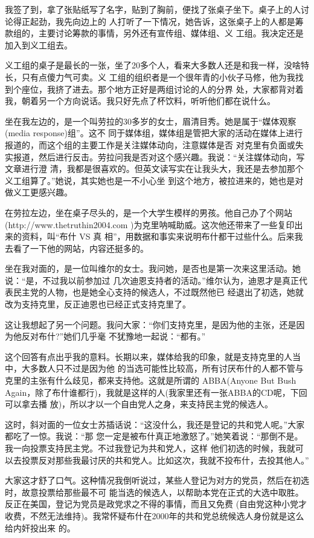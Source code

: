 ﻿\documentclass[11pt]{article}
\begin{document}
我签了到，拿了张贴纸写了名字，贴到了胸前，便找了张桌子坐下。桌子上的人讨论得正起劲，我先向边上的
人打听了一下情况，她告诉，这张桌子上的人都是筹款组的，主要讨论筹款的事情，另外还有宣传组、媒体组、义
工组。我决定还是加入到义工组去。

义工组的桌子是最长的一张，坐了20多个人，看来大多数人还是和我一样，没啥特长，只有点傻力气可卖。义
工组的组织者是一个很年青的小伙子马修，他为我找到个座位，我挤了进去。那个地方正好是两组讨论的人的分界
处，大家都背对着我，朝着另一个方向说话。我只好先点了杯饮料，听听他们都在说什么。

坐在我左边的，是一个叫劳拉的30多岁的女士，眉清目秀。她是属于``媒体观察(media response)组''。这不
同于媒体组，媒体组是管把大家的活动在媒体上进行报道的，而这个组的主要工作是关注媒体动向，注意媒体是否
对克里有负面或失实报道，然后进行反击。劳拉问我是否对这个感兴趣。我说：``关注媒体动向，写文章进行澄
清，我都是很喜欢的。但英文读写实在让我头大，我还是去参加那个义工组算了。''她说，其实她也是一不小心坐
到这个地方，被拉进来的，她也是对做义工更感兴趣。

在劳拉左边，坐在桌子尽头的，是一个大学生模样的男孩。他自己办了个网站
(http://www.thetruthin2004.com )为克里呐喊助威。这次他还带来了一些复印出来的资料，叫``布什 VS 真
相''，用数据和事实来说明布什都干过些什么。后来我去看了一下他的网站，内容还挺多的。

坐在我对面的，是一位叫维尔的女士。我问她，是否也是第一次来这里活动。她说：``是，不过我以前参加过
几次迪恩支持者的活动。''维尔认为，迪恩才是真正代表民主党的人物，也是她全心支持的候选人，不过既然他已
经退出了初选，她就改为支持克里，反正迪恩也已经正式支持克里了。

这让我想起了另一个问题。我问大家：``你们支持克里，是因为他的主张，还是因为他反对布什?''她们几乎毫
不犹豫地一起说：``都有。''

这个回答有点出乎我的意料。长期以来，媒体给我的印象，就是支持克里的人当中，大多数人只不过是因为他
的当选可能性比较高，所有讨厌布什的人都不管与克里的主张有什么歧见，都来支持他。这就是所谓的
ABBA(Anyone But Bush Again，除了布什谁都行)，我就是这样的人(我家里还有一张ABBA的CD呢，下回可以拿去播
放)，所以才以一个自由党人之身，来支持民主党的候选人。

这时，斜对面的一位女士苏插话说：``这没什么，我还是登记的共和党人呢。''大家都吃了一惊。我说：``那
您一定是被布什真正地激怒了。''她笑着说：``那倒不是。我一向投票支持民主党。不过我登记为共和党人，这样
他们初选的时候，我就可以去投票反对那些我最讨厌的共和党人。比如这次，我就不投布什，去投其他人。''

大家这才舒了口气。这种情况我倒听说过，某些人登记为对方的党员，然后在初选时，故意投票给那些最不可
能当选的候选人，以帮助本党在正式的大选中取胜。反正在美国，登记为党员是政党求之不得的事情，而且又免费
(自由党这种小党才收费，不然无法维持)。我常怀疑布什在2000年的共和党总统候选人身份就是这么给内奸投出来
的。
\end{document}
